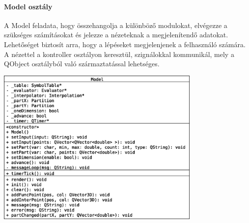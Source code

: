 \documentclass[12pt]{report}
\begin{document}
\paragraph{Model osztály}
A Model feladata, hogy összehangolja a különböző modulokat, elvégezze a szükséges számításokat és jelezze a nézeteknak a megjelenítendő adatokat. Lehetőséget biztosít arra, hogy a lépéseket megjelenjenek a felhasználó számára. A nézettel a kontroller osztályon keresztül, szignálokkal kommunikál, mely a QObject osztályból való származtatással lehetséges.
\begin{center}
\includegraphics[width=10cm]{pics/uml/Model}
\end{center}
\end{document}
